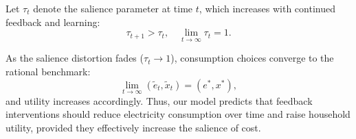 Let \( \tau_t \) denote the salience parameter at time \( t \), which increases with continued feedback and learning:
\[
\tau_{t+1} > \tau_t, \quad \lim_{t \to \infty} \tau_t = 1.
\]

As the salience distortion fades (\( \tau_t \to 1 \)), consumption choices converge to the rational benchmark:
\[
\lim_{t \to \infty} (\tilde{e}_t, \tilde{x}_t) = (e^*, x^*),
\]
and utility increases accordingly. Thus, our model predicts that feedback interventions should reduce electricity consumption over time and raise household utility, provided they effectively increase the salience of cost.



